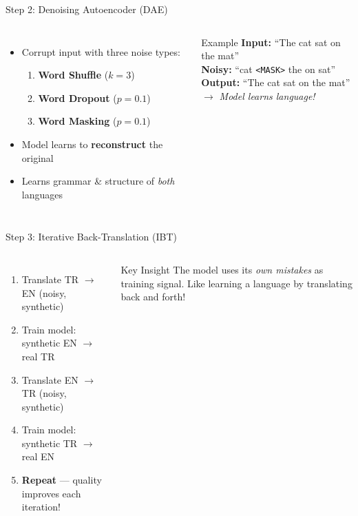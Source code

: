 \documentclass[aspectratio=169]{beamer}
\begin{document}
\begin{frame}{Step 2: Denoising Autoencoder (DAE)}
  \begin{columns}
    \begin{itemize}
      \item Corrupt input with three noise types:
      \begin{enumerate}
        \item \textbf{Word Shuffle} ($k=3$)
        \item \textbf{Word Dropout} ($p=0.1$)
        \item \textbf{Word Masking} ($p=0.1$)
      \end{enumerate}
      \item Model learns to \textbf{reconstruct} the original
      \item Learns grammar \& structure of \emph{both} languages
    \end{itemize}
    \begin{exampleblock}{Example}
      \textbf{Input:} ``The cat sat on the mat'' \\[4pt]
      \textbf{Noisy:} ``cat \texttt{<MASK>} the on sat'' \\[4pt]
      \textbf{Output:} ``The cat sat on the mat'' \\[4pt]
      $\rightarrow$ \textit{Model learns language!}
    \end{exampleblock}
  \end{columns}
\end{frame}

\begin{frame}{Step 3: Iterative Back-Translation (IBT)}
  \begin{columns}
    \begin{enumerate}
      \item Translate TR $\rightarrow$ EN (noisy, synthetic)
      \item Train model: synthetic EN $\rightarrow$ real TR
      \item Translate EN $\rightarrow$ TR (noisy, synthetic)
      \item Train model: synthetic TR $\rightarrow$ real EN
      \item \textbf{Repeat} — quality improves each iteration!
    \end{enumerate}
    \begin{alertblock}{Key Insight}
      The model uses its \emph{own mistakes} as training signal.
      Like learning a language by translating back and forth!
    \end{alertblock}
  \end{columns}
\end{frame}
\end{document}
